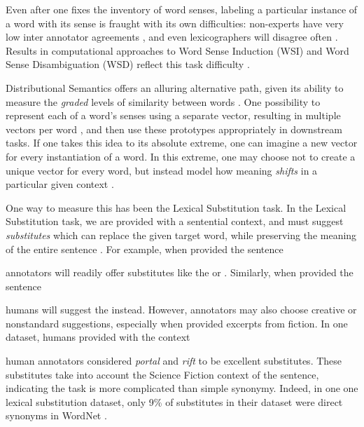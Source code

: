 Even after one fixes the inventory of word senses, labeling a particular
instance of a word with its sense is fraught with its own difficulties:
non-experts have very low inter annotator agreements \cite{yong:1999:siglex},
and even lexicographers will disagree often \cite{kilgarriff:2000:ch}.
Results in computational approaches to Word Sense Induction (WSI) and Word
Sense Disambiguation (WSD) reflect this task difficulty \cite{mccarthy:2009:llc,navigli:2009:csur}.

Distributional Semantics offers an alluring alternative path, given its ability
to measure the {\em graded} levels of similarity between words
\cite{erk:2008:emnlp}.  One possibility to represent each of a word's senses
using a separate vector, resulting in multiple vectors per word
\cite{reisinger:2010:naacl,huang:2012:acl}, and then use
these prototypes appropriately in downstream tasks. If one takes this idea to
its absolute extreme, one can imagine a new vector for every instantiation of a
word. In this extreme, one may choose not to create a unique vector for every
word, but instead model how meaning {\em shifts} in a particular given context
\cite{erk:2008:emnlp,erk:2010:gems}.

One way to measure this has been the Lexical Substitution task. In
the Lexical Substitution task, we are provided with a sentential context, and
must suggest {\em substitutes} which can replace the given target word, while
preserving the meaning of the entire sentence
\cite{mccarthy:2007:semeval,biemann:2012:lrec,kremer:2014:eacl}. For
example, when provided the sentence
\begin{quote}
\end{quote}
annotators will readily offer substitutes like the  or
. Similarly, when provided the sentence
\begin{quote}
\end{quote}
humans will suggest the  instead. However, annotators
may also choose creative or nonstandard suggestions, especially when provided
excerpts from fiction. In one dataset, humans provided with the context
\begin{quote}
\end{quote}
human annotators considered {\em portal} and {\em rift} to be excellent
substitutes. These substitutes take into account the Science Fiction context of
the sentence, indicating the task is more complicated than simple synonymy.
Indeed, in one one lexical substitution dataset, only 9\% of substitutes in
their dataset were direct synonyms in WordNet \cite{kremer:2014:eacl}.

